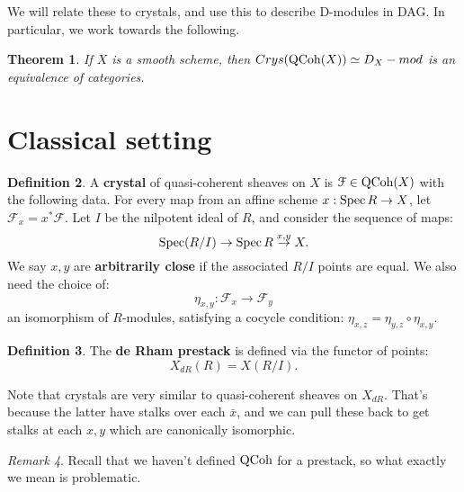 \documentclass[10pt,a4paper,reqno,oneside]{book} %
\theoremstyle{plain}
\newtheorem{thm}{Theorem}[section]
\theoremstyle{definition}
\newtheorem{defin}[thm]{Definition}
\theoremstyle{remark}
\newtheorem{rem}[thm]{Remark}
\numberwithin{equation}{section}
\begin{document}
We will relate these to crystals, and use this to describe D-modules in DAG. In particular, we work towards the following.

\begin{thm}
If $X$ is a smooth scheme, then $Crys(\mathrm{QCoh}(X)) \simeq D_X - mod$ is an equivalence of categories.
\end{thm}

\section{Classical setting}
\label{sect:dmod_class}

\begin{defin}
A \textbf{crystal} of quasi-coherent sheaves on $X$ is $\mathcal{F} \in \mathrm{QCoh}(X)$ with the following data. For every map
from an affine scheme $x : \operatorname{Spec} R \to X$, let $\mathcal{F}_x = x^* \mathcal{F}$. Let $I$ be the nilpotent ideal of $R$,
and consider the sequence of maps:
\[	\operatorname{Spec} (R/I) \to \operatorname{Spec} R \overset{x,y}{\to} X.	\]
We say $x,y$ are \textbf{arbitrarily close} if the associated $R/I$ points are equal. We also need the choice of:
\[	\eta_{x,y} : \mathcal{F}_x \to \mathcal{F}_y	\]
an isomorphism of $R$-modules, satisfying a cocycle condition: $\eta_{x,z} = \eta_{y,z} \circ \eta_{x,y}$.
\end{defin}

\begin{defin}
The \textbf{de Rham prestack} is defined via the functor of points:
\[	X_{dR}(R) = X(R/I) .	\]
\end{defin}

Note that crystals are very similar to quasi-coherent sheaves on $X_{dR}$. That's because the latter have stalks
over each $\bar x$, and we can pull these back to get stalks at each $x, y$ which are canonically isomorphic.

\begin{rem}
Recall that we haven't defined $\mathrm{QCoh}$ for a prestack, so what exactly we mean is problematic.
\end{rem}
\end{document}
